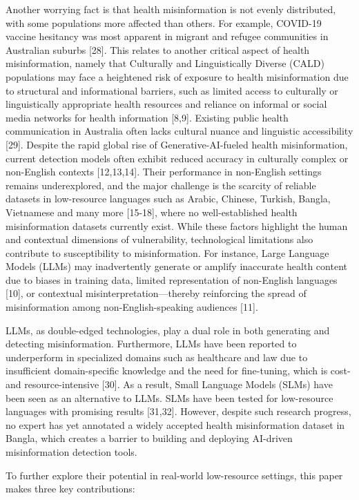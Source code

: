 \documentclass[]{article}
\begin{document}
Another worrying fact is that health misinformation is not evenly
distributed, with some populations more affected than others. For
example, COVID-19 vaccine hesitancy was most apparent in migrant and
refugee communities in Australian suburbs {[}28{]}. This relates to another critical aspect of health misinformation, namely that Culturally
and Linguistically Diverse (CALD) populations may face a heightened risk
of exposure to health misinformation due to structural and informational
barriers, such as limited access to culturally or linguistically
appropriate health resources and reliance on informal or social media
networks for health information {[}8,9{]}. Existing public health
communication in Australia often lacks cultural nuance and linguistic
accessibility {[}29{]}. Despite the rapid global rise of
Generative-AI-fueled health misinformation, current detection models
often exhibit reduced accuracy in culturally complex or non-English
contexts {[}12,13,14{]}. Their performance in non-English settings
remains underexplored, and the major challenge is the scarcity of
reliable datasets in low-resource languages such as Arabic, Chinese,
Turkish, Bangla, Vietnamese and many more {[}15-18{]}, where no
well-established health misinformation datasets currently exist. While
these factors highlight the human and contextual dimensions of
vulnerability, technological limitations also contribute to
susceptibility to misinformation. For instance, Large Language Models
(LLMs) may inadvertently generate or amplify inaccurate health content
due to biases in training data, limited representation of non-English
languages {[}10{]}, or contextual misinterpretation---thereby
reinforcing the spread of misinformation among non-English-speaking
audiences {[}11{]}.

LLMs, as double-edged technologies, play a dual role in both generating
and detecting misinformation. Furthermore, LLMs have been reported to
underperform in specialized domains such as healthcare and law due to
insufficient domain-specific knowledge and the need for fine-tuning,
which is cost- and resource-intensive {[}30{]}. As a result, Small
Language Models (SLMs) have been seen as an alternative to LLMs. SLMs
have been tested for low-resource languages with promising results
{[}31,32{]}. However, despite such research progress, no expert has yet
annotated a widely accepted health misinformation dataset in Bangla,
which creates a barrier to building and deploying AI-driven
misinformation detection tools.

To further explore their potential in real-world low-resource settings,
this paper makes three key contributions:
\end{document}
